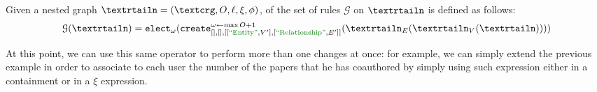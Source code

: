 \begin{definition}[continues=def:gggintro]
	 Given a nested graph $\nested=(\ngraph,O,\ell,\xi,\phi)$, of the set of rules $\mathcal{G}$ on $\nested$ is defined as follows:
\[\mathcal{G}(\nested)=\texttt{elect}_{\omega}(\texttt{create}_{[],[],[[\ONTA,V'],[\RELA,E']]}^{\omega\leftarrow\max O+1}(\nested_E(\nested_V(\nested))))\]
\end{definition}

At this point, we can use this same operator to perform more than one changes at once: for example, we can simply extend the previous example in order to associate to each user the number of the papers that he has coauthored by simply using such expression either in a containment or in a $\xi$ expression.


